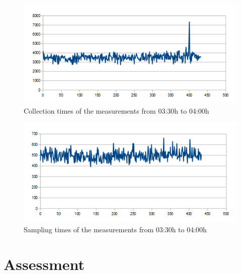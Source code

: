 \begin{figure}[htbp]
	\centering         
    \includegraphics[scale=0.75]{content/images/Experiment/DayCollection}
    \caption{Collection times of the measurements from 03:30h to 04:00h}
	\label{fig:dayC}
\end{figure}



\begin{figure}[tbp]
	\centering
    \includegraphics[scale=0.75]{content/images/Experiment/DayRounds}
   	\caption{Sampling times of the measurements from 03:30h to 04:00h}
    \label{fig:DayR}
\end{figure}
    

\section{Assessment}